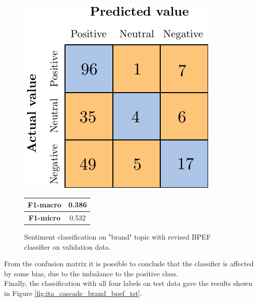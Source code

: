 \begin{figure}[H]
	\begin{minipage}[b]{0.6\linewidth}
		\centering
		\includegraphics[scale=1]{figures/conf_matrices/ita_brand/ita_snt_brand_bpef_afs.pdf}
	\end{minipage}
	\begin{minipage}[b]{0.3\linewidth}
		\begin{tabular}[b]{ | c | c | } 
			\hline
			\textbf{F1-macro} & 0.386 \\
			\hline
			\textbf{F1-micro} & 0.532 \\ 
			\hline
		\end{tabular}
	\end{minipage}
	\caption{Sentiment classification on "brand" topic with revised BPEF classifier on validation data.}
	\label{fig:ita_snt_brand_bpef_afs}
\end{figure}


From the confusion matrix it is possible to conclude that the classifier is affected by some bias, due to the imbalance to the positive class.\\
Finally, the classification with all four labels on test data gave the results shown in Figure \ref{fig:ita_cascade_brand_bpef_tst}.

